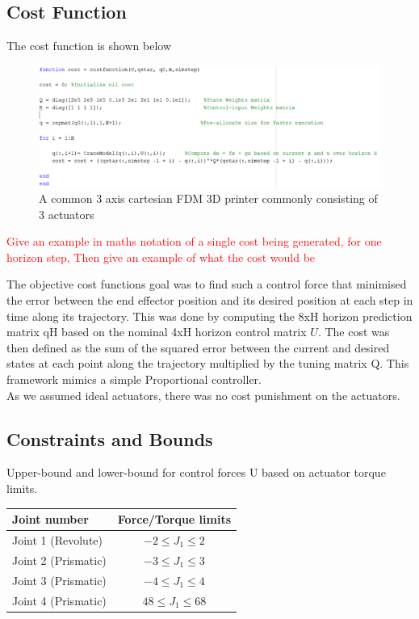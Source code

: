 \documentclass{UoNMCHA}
\numberwithin{equation}{section}
\begin{document}
	
	\subsection{Cost Function}
	The cost function is shown below
	
	\begin{figure}[H]
		\begin{center}
			\includegraphics[width=.8\linewidth]{figs/Picture12}
			\caption{A  common 3 axis cartesian FDM 3D printer commonly consisting of 3 actuators}
			\label{figs/Picture12}
		\end{center}
	\end{figure}
	
	
	\textcolor{red}{Give an example in maths notation of a single cost being generated, for one horizon step,
	Then give an example of what the cost would be} \par

	The objective cost functions goal was to find such a control force that minimised the error between the end effector position and its desired position at each step in time along its trajectory. This was done by computing the 8xH horizon prediction matrix qH based on the nominal 4xH horizon control matrix $ U $. The cost was then defined as the sum of the squared error between the current and desired states at each point along the trajectory multiplied by the tuning matrix Q. This framework mimics a simple Proportional controller. \\
	As we assumed ideal actuators, there was no cost punishment on the actuators.
	
	\newpage
	\subsection{Constraints and Bounds}
	Upper-bound and lower-bound for control forces U based on actuator torque limits.
	
	\begin{table}[H]\center
	\begin{centering}
		\begin{tabular}{lc}
			\textbf{Joint number} & \textbf{Force/Torque limits} \\ \hline
			Joint 1 (Revolute)&  $ -2 \leq J_1 \leq 2 $  \\ \hline
			Joint 2 (Prismatic)&  $ -3 \leq J_1 \leq 3 $ \\ \hline   
			Joint 3 (Prismatic) &  $ -4 \leq J_1 \leq 4 $ \\ \hline    
			Joint 4 (Prismatic) &  $ 48 \leq J_1 \leq 68 $ \\ \hline                                    
		\end{tabular}
	\end{centering}
\end{table}
	
\end{document}
